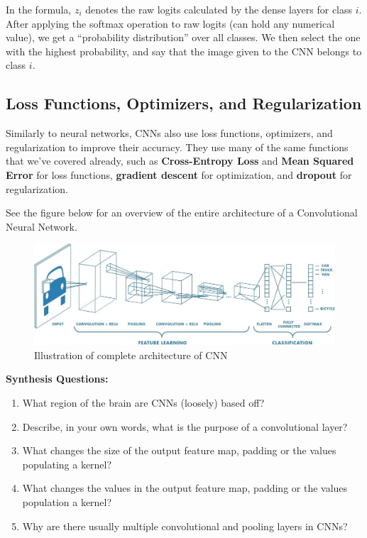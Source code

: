         In the formula, $z_i$ denotes the raw logits calculated by the dense layers for class $i$. After applying the softmax operation to raw logits (can hold any numerical value), we get a ``probability distribution'' over all classes. We then select the one with the highest probability, and say that the image given to the CNN belongs to class $i$.

        \subsection{Loss Functions, Optimizers, and Regularization}
        Similarly to neural networks, CNNs also use loss functions, optimizers, and regularization to improve their accuracy. They use many of the same functions that we've covered already, such as \textbf{Cross-Entropy Loss} and \textbf{Mean Squared Error} for loss functions, \textbf{gradient descent} for optimization, and \textbf{dropout} for regularization. \break

        See the figure below for an overview of the entire architecture of a Convolutional Neural Network.  \break
        
        \begin{figure}[H]
            \centering
            \includegraphics[width=1\linewidth]{cv/full_cnn.png}
            \caption{Illustration of complete architecture of CNN}
            \label{fig:full_cnn}
        \end{figure}

\vspace{10bp}
\begin{questionbox}
    \textbf{Synthesis Questions:}
    \begin{enumerate}    
        \item What region of the brain are CNNs (loosely) based off?
        \item Describe, in your own words, what is the purpose of a convolutional layer?
        \item What changes the size of the output feature map, padding or the values populating a kernel?
        \item What changes the values in the output feature map, padding or the values population a kernel?
        \item Why are there usually multiple convolutional and pooling layers in CNNs?
    \end{enumerate}
    \vspace{1bp}
\end{questionbox}

